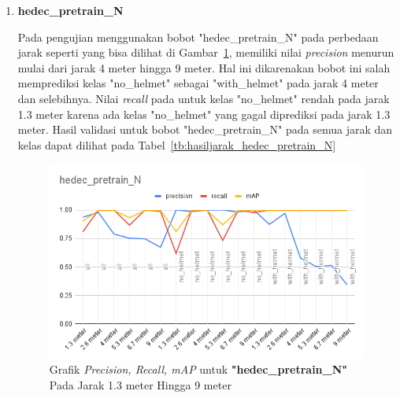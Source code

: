 \begin{enumerate}
  \item \textbf{hedec\_pretrain\_N}
  
  \par Pada pengujian menggunakan bobot "hedec\_pretrain\_N" pada perbedaan jarak seperti yang bisa dilihat di Gambar~\ref{fig:grafvaljarak_hedec_pretrain_N}, memiliki nilai
  \emph{precision} menurun mulai dari jarak 4 meter hingga 9 meter. Hal ini dikarenakan bobot ini salah memprediksi kelas "no\_helmet" sebagai "with\_helmet" pada jarak 4 meter
  dan selebihnya. Nilai \emph{recall} pada untuk kelas "no\_helmet" rendah pada jarak 1.3 meter karena ada kelas "no\_helmet" yang
  gagal diprediksi pada jarak 1.3 meter. Hasil validasi untuk bobot "hedec\_pretrain\_N" pada semua jarak dan kelas dapat dilihat pada Tabel~\ref{tb:hasiljarak_hedec_pretrain_N}

  \begin{figure} [h!]
    \centering
    \includegraphics[width=1\textwidth]{gambar/BerdasarkanJarak/hedec_pretrain_N.png}
    \caption{Grafik \emph{Precision, Recall, mAP} untuk \textbf{"hedec\_pretrain\_N"} Pada Jarak 1.3 meter Hingga 9 meter}
    \label{fig:grafvaljarak_hedec_pretrain_N}  
  \end{figure}


\end{enumerate}
